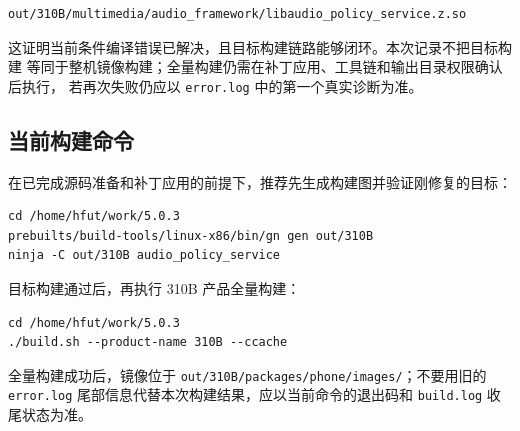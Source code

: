 \begin{lstlisting}[style=shell]
out/310B/multimedia/audio_framework/libaudio_policy_service.z.so
\end{lstlisting}

这证明当前条件编译错误已解决，且目标构建链路能够闭环。本次记录不把目标构建
等同于整机镜像构建；全量构建仍需在补丁应用、工具链和输出目录权限确认后执行，
若再次失败仍应以 \texttt{error.log} 中的第一个真实诊断为准。

\subsection{当前构建命令}

在已完成源码准备和补丁应用的前提下，推荐先生成构建图并验证刚修复的目标：

\begin{lstlisting}[style=shell]
cd /home/hfut/work/5.0.3
prebuilts/build-tools/linux-x86/bin/gn gen out/310B
ninja -C out/310B audio_policy_service
\end{lstlisting}

目标构建通过后，再执行 310B 产品全量构建：

\begin{lstlisting}[style=shell]
cd /home/hfut/work/5.0.3
./build.sh --product-name 310B --ccache
\end{lstlisting}

全量构建成功后，镜像位于
\texttt{out/310B/packages/phone/images/}；不要用旧的
\texttt{error.log} 尾部信息代替本次构建结果，应以当前命令的退出码和
\texttt{build.log} 收尾状态为准。
